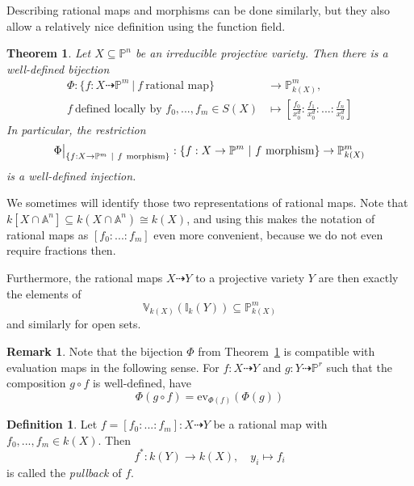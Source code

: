 \documentclass{scrartcl}
\newcommand{\I}{\mathbb{I}}
\newcommand{\V}{\mathbb{V}}
\newcommand\restr[2]{{
    \left.\kern-\nulldelimiterspace
    #1
    \vphantom{\big|}
    \right|_{#2}
}}
\newtheorem{theorem}[prop]{Theorem}
\theoremstyle{definition}
\newtheorem{definition}[prop]{Definition}
\newtheorem{remark}[prop]{Remark}
\begin{document}
Describing rational maps and morphisms can be done similarly, but they also allow a relatively nice definition using the function field.
\begin{theorem}
    \label{prop:rational_map_function_field}
    Let $X \subseteq \mathbb{P}^n$ be an irreducible projective variety. Then there is a well-defined bijection
    \begin{align*}
        \Phi: \{ f: X \dashrightarrow \mathbb{P}^m \ | \ f \ \text{rational map} \} &\to \mathbb{P}_{k(X)}^m, \\
        f \ \text{defined locally by $f_0, ..., f_m \in S(X)$} &\mapsto \left[ \frac {f_0} {x_0^d}  : \frac {f_1} {x_0^d} : ... : \frac {f_n} {x_0^d} \right]
    \end{align*}
    In particular, the restriction
    \begin{equation*}
        \restr{\Phi}{\{f: X \to \mathbb{P}^m \ | \ f \ \text{morphism}\}}: \{f: X \to \mathbb{P}^m \ | \ f \ \text{morphism}\} \to \mathbb{P}_{k(X)}^m
    \end{equation*}
    is a well-defined injection.
\end{theorem}
We sometimes will identify those two representations of rational maps.
Note that $k[X \cap \mathbb{A}^n] \subseteq k(X \cap \mathbb{A}^n) \cong k(X)$, and using this makes the notation of rational maps as $[f_0 : ... : f_m]$ even more convenient, because we do not even require fractions then.

Furthermore, the rational maps $X \dashrightarrow Y$ to a projective variety $Y$ are then exactly the elements of 
\begin{equation*}
    \V_{k(X)}(\I_k(Y)) \subseteq \mathbb{P}^m_{k(X)}
\end{equation*}
and similarly for open sets.

\begin{remark}
    Note that the bijection $\Phi$ from Theorem~\ref{prop:rational_map_function_field} is compatible with evaluation maps in the following sense.
    For $f: X \dashrightarrow Y$ and $g: Y \dashrightarrow \mathbb{P}^r$ such that the composition $g \circ f$ is well-defined, have
    \begin{equation*}
        \Phi(g \circ f) = \mathrm{ev}_{\Phi(f)}(\Phi(g))
    \end{equation*}
\end{remark}

\begin{definition}
    Let $f = [f_0 : ... : f_m]: X \dashrightarrow Y$ be a rational map with $f_0, ..., f_m \in k(X)$.
    Then
    \begin{equation*}
        f^*: k(Y) \to k(X), \quad y_i \mapsto f_i
    \end{equation*}
    is called the \emph{pullback} of $f$.
\end{definition}
\end{document}
